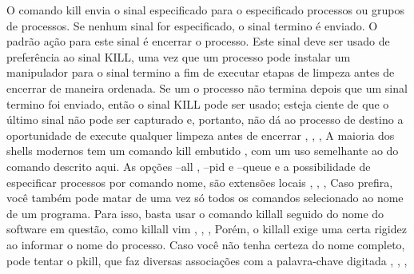 O comando kill envia o sinal especificado para o especificado processos ou grupos de processos.
Se nenhum sinal for especificado, o sinal termino é enviado. O padrão ação para este sinal é encerrar o processo. Este sinal deve ser usado de preferência ao sinal KILL, uma vez que um     processo pode instalar um manipulador para o sinal termino a fim de executar etapas de limpeza antes de encerrar de maneira ordenada. Se um o processo não termina depois que um sinal termino foi enviado, então o sinal KILL pode ser usado; esteja ciente de que o último sinal não pode   ser capturado e, portanto, não dá ao processo de destino a oportunidade de execute qualquer limpeza antes de encerrar \cite{Tanenbaum2016}, \cite{info2020}, \cite{Morimoto2011}, \cite{Man2020}
A maioria dos shells modernos tem um comando kill embutido , com um uso semelhante ao do comando descrito aqui. As opções --all , --pid e --queue e a possibilidade de especificar processos por comando nome, são extensões locais \cite{Tanenbaum2016}, \cite{info2020}, \cite{Morimoto2011}, \cite{Man2020}
Caso prefira, você também pode matar de uma vez só todos os comandos selecionado ao nome de um programa. Para isso, basta usar o comando killall seguido do nome do software em questão, como killall vim \cite{Tanenbaum2016}, \cite{info2020}, \cite{Morimoto2011}, \cite{Man2020}
Porém, o killall exige uma certa rigidez ao informar o nome do processo. Caso você não tenha certeza do nome completo, pode tentar o pkill, que faz diversas associações com a palavra-chave digitada \cite{Tanenbaum2016}, \cite{info2020}, \cite{Morimoto2011}, \cite{Man2020}
